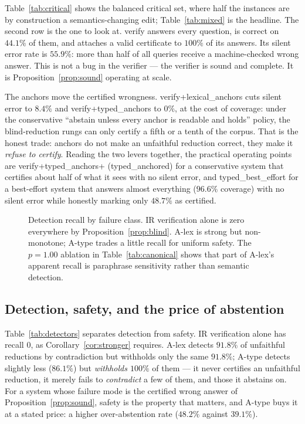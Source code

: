 \documentclass[11pt]{article}
\newcommand{\pVerify}{\textsf{verify}}
\newcommand{\pLex}{\textsf{verify+lexical\_anchors}}
\newcommand{\pTyp}{\textsf{verify+typed\_anchors}}
\newcommand{\pTypAnch}{\textsf{typed\_anchored}}
\newcommand{\pTypBest}{\textsf{typed\_best\_effort}}
\newcommand{\Alex}{\textsf{A-lex}}
\newcommand{\Atype}{\textsf{A-type}}
\theoremstyle{definition}
\begin{document}


Table~\ref{tab:critical} shows the balanced critical set, where half the
instances are by construction a semantics-changing edit; Table~\ref{tab:mixed} is
the headline. The second row is the one to look
at. \pVerify{} answers every question, is correct on $44.1\%$ of them, and
attaches a valid certificate to $100\%$ of its answers. Its silent error rate is
$55.9\%$: more than half of all queries receive a machine-checked wrong answer.
This is not a bug in the verifier --- the verifier is sound and complete. It is
Proposition~\ref{prop:sound} operating at scale.

The anchors move the certified wrongness. \pLex{} cuts silent error to $8.4\%$ and
\pTyp{} to $0\%$, at the cost of coverage: under the conservative
``abstain unless every anchor is readable and holds'' policy, the blind-reduction
rungs can only certify a fifth or a tenth of the corpus. That is the honest
trade: anchors do not make an unfaithful reduction correct, they make it
\emph{refuse to certify}. Reading the two levers together, the practical
operating points are \pTyp{}+ (\pTypAnch) for a conservative system that certifies
about half of what it sees with no silent error, and \pTypBest{} for a
best-effort system that answers almost everything ($96.6\%$ coverage) with no
silent error while honestly marking only $48.7\%$ as certified.

\begin{figure}[t]
  \centering
  
  \caption{Detection recall by failure class. IR verification alone is zero
  everywhere by Proposition~\ref{prop:blind}. \Alex{} is strong but non-monotone;
  \Atype{} trades a little recall for uniform safety. The $p{=}1.00$ ablation in
  Table~\ref{tab:canonical} shows that part of \Alex's apparent recall is
  paraphrase sensitivity rather than semantic detection.}
  \label{fig:recall}
\end{figure}

\subsection{Detection, safety, and the price of abstention}
\label{sec:detectors}



Table~\ref{tab:detectors} separates detection from safety. IR verification
alone has recall $0$, as Corollary~\ref{cor:stronger} requires. \Alex{} detects
$91.8\%$ of unfaithful reductions by contradiction but withholds only the same
$91.8\%$; \Atype{} detects slightly less ($86.1\%$) but \emph{withholds $100\%$} of
them --- it never certifies an unfaithful reduction, it merely fails to
\emph{contradict} a few of them, and those it abstains on. For a system whose
failure mode is the certified wrong answer of Proposition~\ref{prop:sound}, safety
is the property that matters, and \Atype{} buys it at a stated price: a higher
over-abstention rate ($48.2\%$ against $39.1\%$).
\end{document}
